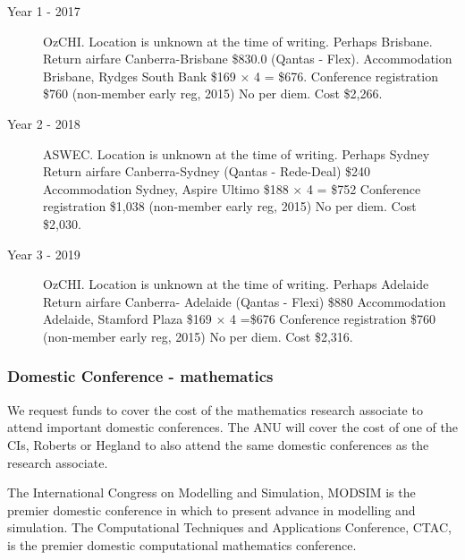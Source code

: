\documentclass[a4paper,fontsize=12pt]{scrartcl}
\begin{document}
\begin{description}
\item[Year 1 - 2017] OzCHI. 
Location is unknown at the time of writing. Perhaps Brisbane. 
Return airfare Canberra-Brisbane \$830.0 (Qantas - Flex). Accommodation Brisbane, 
Rydges South Bank \$169 $\times$  4 = \$676. 
Conference registration \$760 (non-member early reg, 2015) No per diem. Cost \$2,266. 

\item[Year 2 - 2018] ASWEC.
Location is unknown at the time of writing. Perhaps Sydney
Return airfare Canberra-Sydney (Qantas - Rede-Deal) \$240
Accommodation Sydney, Aspire Ultimo \$188 $\times$ 4 = \$752
Conference registration \$1,038 (non-member early reg, 2015) 
No per diem. Cost \$2,030.



\item[Year 3 -  2019] OzCHI.
Location is unknown at the time of writing. Perhaps Adelaide
Return airfare Canberra- Adelaide (Qantas - Flexi) \$880
Accommodation Adelaide, Stamford Plaza \$169 $\times$ 4 =\$676
Conference registration \$760 (non-member early reg, 2015)
No per diem. Cost \$2,316.


\end{description}



\subsubsection*{Domestic Conference - mathematics}

We request funds to cover the cost of the mathematics research associate to attend important domestic conferences.  The ANU will cover the cost of one of the CIs, Roberts or Hegland to also attend the same domestic conferences as the research associate. 

The International Congress on Modelling and Simulation, MODSIM is the premier domestic conference in which to present advance in modelling and simulation. 
The Computational Techniques and Applications Conference, CTAC, is the premier domestic computational mathematics conference.
\end{document}
